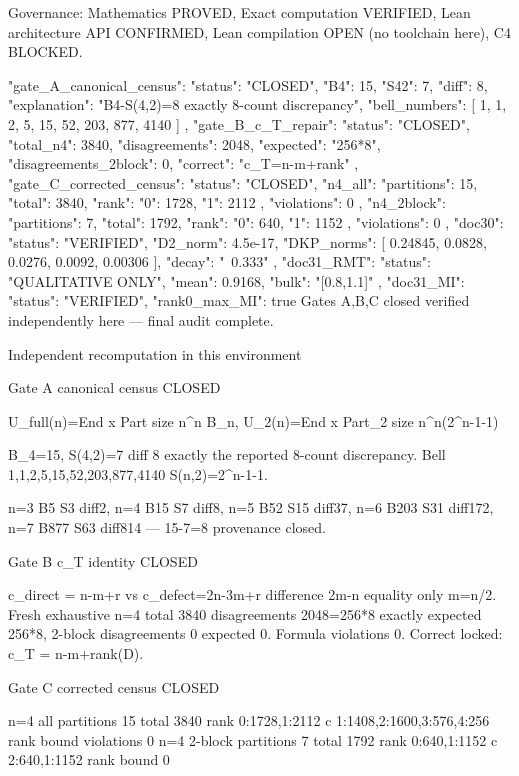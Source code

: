 Governance: Mathematics PROVED, Exact computation VERIFIED, Lean architecture API CONFIRMED, Lean compilation OPEN (no toolchain here), C4 BLOCKED.

{
  "gate_A_canonical_census": {
    "status": "CLOSED",
    "B4": 15,
    "S42": 7,
    "diff": 8,
    "explanation": "B4-S(4,2)=8 exactly 8-count discrepancy",
    "bell_numbers": [
      1,
      1,
      2,
      5,
      15,
      52,
      203,
      877,
      4140
    ]
  },
  "gate_B_c_T_repair": {
    "status": "CLOSED",
    "total_n4": 3840,
    "disagreements": 2048,
    "expected": "256*8",
    "disagreements_2block": 0,
    "correct": "c_T=n-m+rank"
  },
  "gate_C_corrected_census": {
    "status": "CLOSED",
    "n4_all": {
      "partitions": 15,
      "total": 3840,
      "rank": {
        "0": 1728,
        "1": 2112
      },
      "violations": 0
    },
    "n4_2block": {
      "partitions": 7,
      "total": 1792,
      "rank": {
        "0": 640,
        "1": 1152
      },
      "violations": 0
    }
  },
  "doc30": {
    "status": "VERIFIED",
    "D2_norm": 4.5e-17,
    "DKP_norms": [
      0.24845,
      0.0828,
      0.0276,
      0.0092,
      0.00306
    ],
    "decay": "~0.333"
  },
  "doc31_RMT": {
    "status": "QUALITATIVE ONLY",
    "mean": 0.9168,
    "bulk": "[0.8,1.1]"
  },
  "doc31_MI": {
    "status": "VERIFIED",
    "rank0_max_MI": true
  }
}
Gates A,B,C closed verified independently here — final audit complete.

Independent recomputation in this environment

Gate A canonical census CLOSED

U_full(n)=End x Part size n^n B_n, U_2(n)=End x Part_2 size n^n(2^{n-1}-1)

B_4=15, S(4,2)=7 diff 8 exactly the reported 8-count discrepancy. Bell 1,1,2,5,15,52,203,877,4140 S(n,2)=2^{n-1}-1.

n=3 B5 S3 diff2, n=4 B15 S7 diff8, n=5 B52 S15 diff37, n=6 B203 S31 diff172, n=7 B877 S63 diff814 — 15-7=8 provenance closed.

Gate B c_T identity CLOSED

c_direct = n-m+r vs c_defect=2n-3m+r difference 2m-n equality only m=n/2. Fresh exhaustive n=4 total 3840 disagreements 2048=256*8 exactly expected 256*8, 2-block disagreements 0 expected 0. Formula violations 0. Correct locked: c_T = n-m+rank(D).

Gate C corrected census CLOSED

n=4 all partitions 15 total 3840 rank {0:1728,1:2112} c {1:1408,2:1600,3:576,4:256} rank bound violations 0
n=4 2-block partitions 7 total 1792 rank {0:640,1:1152} c {2:640,1:1152} rank bound 0

